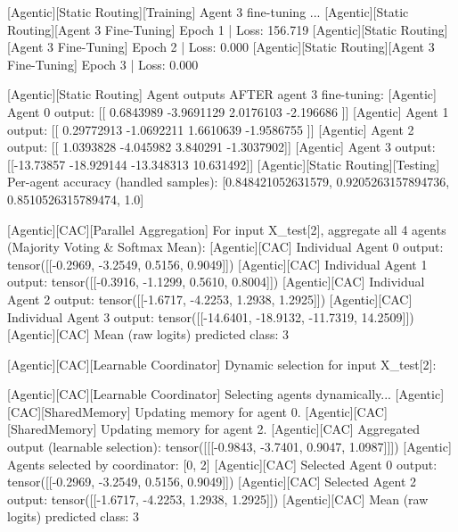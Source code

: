[Agentic][Static Routing][Training] Agent 3 fine-tuning ...
[Agentic][Static Routing][Agent 3 Fine-Tuning] Epoch 1 | Loss: 156.719
[Agentic][Static Routing][Agent 3 Fine-Tuning] Epoch 2 | Loss: 0.000
[Agentic][Static Routing][Agent 3 Fine-Tuning] Epoch 3 | Loss: 0.000

[Agentic][Static Routing] Agent outputs AFTER agent 3 fine-tuning:
[Agentic] Agent 0 output: [[ 0.6843989 -3.9691129  2.0176103 -2.196686 ]]
[Agentic] Agent 1 output: [[ 0.29772913 -1.0692211   1.6610639  -1.9586755 ]]
[Agentic] Agent 2 output: [[ 1.0393828 -4.045982   3.840291  -1.3037902]]
[Agentic] Agent 3 output: [[-13.73857  -18.929144 -13.348313  10.631492]]
[Agentic][Static Routing][Testing] Per-agent accuracy (handled samples): [0.848421052631579, 0.9205263157894736, 0.8510526315789474, 1.0]

[Agentic][CAC][Parallel Aggregation] For input X_test[2], aggregate all 4 agents (Majority Voting & Softmax Mean):
[Agentic][CAC] Individual Agent 0 output: tensor([[-0.2969, -3.2549,  0.5156,  0.9049]])
[Agentic][CAC] Individual Agent 1 output: tensor([[-0.3916, -1.1299,  0.5610,  0.8004]])
[Agentic][CAC] Individual Agent 2 output: tensor([[-1.6717, -4.2253,  1.2938,  1.2925]])
[Agentic][CAC] Individual Agent 3 output: tensor([[-14.6401, -18.9132, -11.7319,  14.2509]])
[Agentic][CAC] Mean (raw logits) predicted class: 3

[Agentic][CAC][Learnable Coordinator] Dynamic selection for input X_test[2]:

[Agentic][CAC][Learnable Coordinator] Selecting agents dynamically...
[Agentic][CAC][SharedMemory] Updating memory for agent 0.
[Agentic][CAC][SharedMemory] Updating memory for agent 2.
[Agentic][CAC] Aggregated output (learnable selection): tensor([[[-0.9843, -3.7401,  0.9047,  1.0987]]])
[Agentic] Agents selected by coordinator: [0, 2]
[Agentic][CAC] Selected Agent 0 output: tensor([[-0.2969, -3.2549,  0.5156,  0.9049]])
[Agentic][CAC] Selected Agent 2 output: tensor([[-1.6717, -4.2253,  1.2938,  1.2925]])
[Agentic][CAC] Mean (raw logits) predicted class: 3